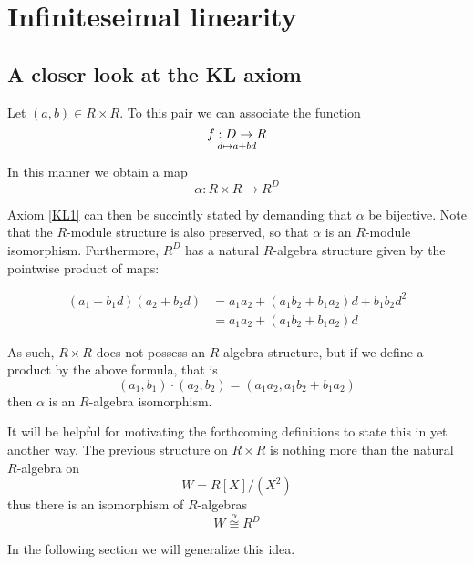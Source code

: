 \documentclass[11pt]{article}
\theoremstyle{definition}
\newcommand{\quot}[2]{#1/#2} %
\numberwithin{equation}{section}
\begin{document}
\section{Infiniteseimal linearity}

\subsection{A closer look at the KL axiom}

Let \( (a,b)\in R\times R \). To this pair we can associate the function
\begin{equation*}
  f:D\to R
  \atop
  d\mapsto a + bd
\end{equation*}

In this manner we obtain a map
\begin{equation*}
  \alpha : R\times R\to R^D
\end{equation*}

Axiom \ref{KL1} can then be succintly stated by demanding that \( \alpha \) be bijective. Note that the \( R \)-module structure is also preserved, so that \( \alpha \) is an \( R \)-module isomorphism. Furthermore, \( R^D \) has a natural \( R \)-algebra structure given by the pointwise product of maps:

\begin{align}
  (a_1 + b_1d)(a_2 + b_2d) & = a_1a_2 + (a_1b_2 + b_1a_2)d + b_1b_2d^2 \\
                           & = a_1a_2 + (a_1b_2 + b_1a_2)d
  \label{R-alg}
\end{align}

As such, \( R\times R \) does not possess an \( R \)-algebra structure, but if we define a product by the above formula, that is
\begin{equation*}
  (a_1,b_1)\cdot(a_2,b_2) = (a_1a_2,a_1b_2 + b_1a_2)
\end{equation*}
then \( \alpha  \) is an \( R \)-algebra isomorphism.

It will be helpful for motivating the forthcoming definitions to state this in yet another way. The previous structure on \( R\times R \) is nothing more than the natural \( R \)-algebra on
\begin{equation*}
  W = \quot{R[X]}{(X^2)}
\end{equation*}
thus there is an isomorphism of \( R \)-algebras
\begin{equation*}
  W \stackrel{\alpha}{\cong} R^D
\end{equation*}

In the following section we will generalize this idea.
\end{document}
